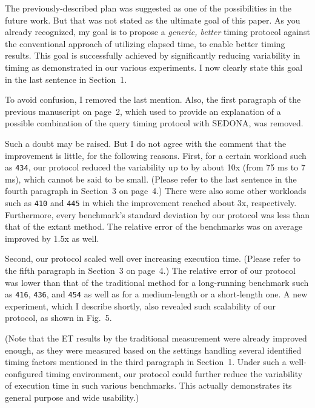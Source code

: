 \documentclass[10pt,letterpaper]{article}
\newenvironment{myindentpar}[1]%
{\begin{list}{}
         {\vspace{10pt}
					\setlength{\leftmargin}{#1}}
          \item[]
}
{\end{list}}
\newcommand{\rev}[1]{\begin{myindentpar}{.25in} {\em {\color{blue}{#1}}}\end{myindentpar}}
\begin{document}
The previously-described plan was suggested as one of the possibilities 
in the future work. But that was not stated as the ultimate goal of this paper. 
As you already recognized, my goal is to propose a {\em generic, better} timing protocol against the 
conventional approach of utilizing elapsed time, 
to enable better timing results. This goal is successfully achieved 
by significantly reducing variability in timing as demonstrated in our various experiments. 
I now clearly state this goal in the last sentence in Section~1. 

To avoid confusion, I removed the last mention. Also, the first paragraph of the previous manuscript on page~2, 
which used to provide an explanation of a possible combination of the query timing protocol 
with SEDONA, was removed.

\rev{
(2) If the proposed approach is for a generic purpose, there is a strong
doubt about usability. The improvement of the SEDONA is little. And the
extent of the each benchmark’s improvement described in Table 3
varies widely. Thus, the experimental results does not confirm whether
the SEDONA is widely practical or is useful. The description to clarify
the SEDONA’s characteristics is needed.
} 

Such a doubt may be raised. But I do not agree with the comment that the improvement is little, 
for the following reasons.
First, for a certain workload such as {\tt 434}, 
our protocol reduced the variability up to by about 10x 
(from 75 ms to 7 ms), 
which cannot be said to be small. (Please refer to the last sentence 
in the fourth paragraph in Section~3 on page~4.)
There were also some other workloads such as {\tt 410} and {\tt 445} 
in which the improvement reached about 3x, respectively. 
Furthermore, every benchmark's standard deviation by our protocol 
was less than that of the extant method. 
The relative error of the benchmarks was on average improved 
by 1.5x as well.

Second, our protocol scaled well over increasing execution time. 
(Please refer to the fifth paragraph in Section~3 on page~4.)
The relative error of our protocol was lower than that of the traditional method 
for a long-running benchmark such as {\tt 416}, {\tt 436}, and {\tt 454} 
as well as for a medium-length or a short-length one. 
A new experiment, 
which I describe shortly, also revealed 
such scalability of our protocol, as shown in Fig.~5.

(Note that the ET results by the traditional measurement were already 
improved enough, as they were measured based 
on the settings handling several identified timing factors mentioned in the third paragraph 
in Section~1. Under such a well-configured timing environment, our protocol could further 
reduce the variability of execution time in such various benchmarks. 
This actually demonstrates its general purpose and wide usability.)
\end{document}
